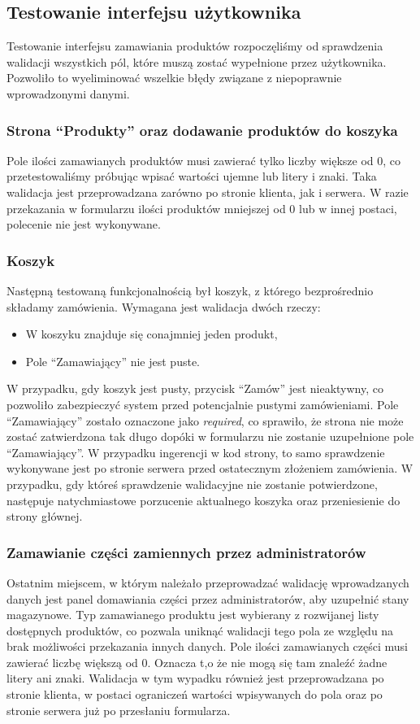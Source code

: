 \documentclass{article}
\begin{document}
\subsection{Testowanie interfejsu użytkownika}
Testowanie interfejsu zamawiania produktów rozpoczęliśmy od sprawdzenia
walidacji wszystkich pól, które muszą zostać wypełnione przez użytkownika.
Pozwoliło to wyeliminować wszelkie błędy związane z niepoprawnie wprowadzonymi
danymi.

\subsubsection{Strona ``Produkty'' oraz dodawanie produktów do koszyka}
Pole ilości zamawianych produktów musi zawierać tylko liczby większe od 0, co
przetestowaliśmy próbując wpisać wartości ujemne lub litery i znaki. Taka
walidacja jest przeprowadzana zarówno po stronie klienta, jak i serwera. W razie
przekazania w formularzu ilości produktów mniejszej od 0 lub w innej postaci, polecenie nie jest wykonywane.

\subsubsection{Koszyk}
Następną testowaną funkcjonalnością był koszyk, z którego bezprośrednio składamy
zamówienia. Wymagana jest walidacja dwóch rzeczy:
\begin{itemize}
   \item W koszyku znajduje się conajmniej jeden produkt,
   \item Pole ``Zamawiający'' nie jest puste.
\end{itemize}
W przypadku, gdy koszyk jest pusty, przycisk ``Zamów'' jest nieaktywny, co pozwoliło zabezpieczyć system przed potencjalnie pustymi zamówieniami. Pole ``Zamawiający'' zostało
oznaczone jako \textit{required}, co sprawiło, że strona nie może zostać zatwierdzona
tak długo dopóki w formularzu nie zostanie uzupełnione pole ``Zamawiający''. W przypadku ingerencji w kod strony, to samo sprawdzenie wykonywane jest po stronie serwera przed ostatecznym złożeniem zamówienia. W przypadku, gdy któreś sprawdzenie walidacyjne nie zostanie potwierdzone, następuje natychmiastowe porzucenie aktualnego koszyka oraz przeniesienie do strony głównej.

\subsubsection{Zamawianie części zamiennych przez administratorów}
Ostatnim miejscem, w którym należało przeprowadzać walidację wprowadzanych
danych jest panel domawiania części przez administratorów, aby uzupełnić stany
magazynowe. Typ zamawianego produktu jest wybierany z rozwijanej listy
dostępnych produktów, co pozwala uniknąć walidacji tego pola ze względu na brak
możliwości przekazania innych danych. Pole ilości zamawianych części musi
zawierać liczbę większą od 0. Oznacza t,o że nie mogą się tam znaleźć żadne
litery ani znaki. Walidacja w tym wypadku również jest przeprowadzana po stronie
klienta, w postaci ograniczeń wartości wpisywanych do pola oraz po stronie
serwera już po przesłaniu formularza.
\end{document}
